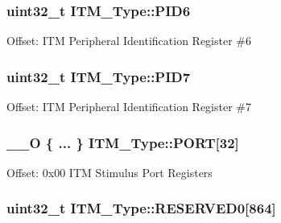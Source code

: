 \subsubsection[{\texorpdfstring{P\+I\+D6}{PID6}}]{ uint32\+\_\+t I\+T\+M\+\_\+\+Type\+::\+P\+I\+D6}\hypertarget{structITM__Type_a755c0ec919e7dbb5f7ff05c8b56a3383}{}\label{structITM__Type_a755c0ec919e7dbb5f7ff05c8b56a3383}
Offset\+: I\+TM Peripheral Identification Register \#6 
\subsubsection[{\texorpdfstring{P\+I\+D7}{PID7}}]{ uint32\+\_\+t I\+T\+M\+\_\+\+Type\+::\+P\+I\+D7}\hypertarget{structITM__Type_aa31ca6bb4b749201321b23d0dbbe0704}{}\label{structITM__Type_aa31ca6bb4b749201321b23d0dbbe0704}
Offset\+: I\+TM Peripheral Identification Register \#7 
\subsubsection[{\texorpdfstring{P\+O\+RT}{PORT}}]{\setlength{\rightskip}{0pt plus 5cm}\+\_\+\+\_\+O \{ ... \}    I\+T\+M\+\_\+\+Type\+::\+P\+O\+RT\mbox{[}32\mbox{]}}\hypertarget{structITM__Type_ab6890c514a53655eef5289350bf2900a}{}\label{structITM__Type_ab6890c514a53655eef5289350bf2900a}
Offset\+: 0x00 I\+TM Stimulus Port Registers 
\subsubsection[{\texorpdfstring{R\+E\+S\+E\+R\+V\+E\+D0}{RESERVED0}}]{\setlength{\rightskip}{0pt plus 5cm}uint32\+\_\+t I\+T\+M\+\_\+\+Type\+::\+R\+E\+S\+E\+R\+V\+E\+D0\mbox{[}864\mbox{]}}\hypertarget{structITM__Type_a2c5ae30385b5f370d023468ea9914c0e}{}\label{structITM__Type_a2c5ae30385b5f370d023468ea9914c0e}

